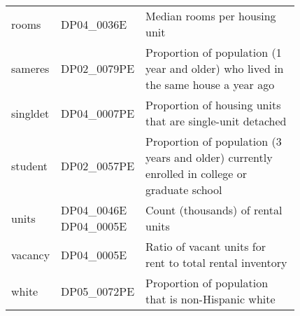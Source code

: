 \begin{tabular}{l p{0.15\linewidth} p{0.675\linewidth}}
rooms    & DP04\_0036E  & Median rooms per housing unit\\
sameres  & DP02\_0079PE & Proportion of population (1 year and older) who lived in the same house a year ago\\
singldet & DP04\_0007PE & Proportion of housing units that are single-unit detached\\
student  & DP02\_0057PE & Proportion of population (3 years and older) currently enrolled in college or graduate school\\
units    & DP04\_0046E DP04\_0005E & Count (thousands) of rental units\\
vacancy  & DP04\_0005E  & Ratio of vacant units for rent to total rental inventory\\
white    & DP05\_0072PE & Proportion of population that is non-Hispanic white\\
\bottomrule
\end{tabular}
